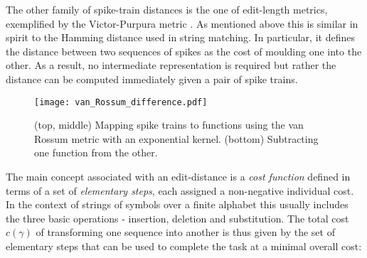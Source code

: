 \documentclass[12pt]{extarticle}
\begin{document}
\noindent
The other family of spike-train distances is the one of edit-length
metrics, exemplified by the Victor-Purpura metric \cite{Victor-Purpura_1,
  Victor-Purpura_2}. As mentioned above this is similar in spirit to the Hamming
distance used in string matching. In particular, it defines the
distance between two sequences of spikes as the cost of moulding one
into the other. As a result, no intermediate representation is
required but rather the distance can be computed immediately given a
pair of spike trains.\\

\begin{comment}
This can be modelled by adding an extra parameter:
\begin{equation}
	\delta f = 1 - \mu f
\end{equation}
with $0 \leq \mu \leq 1$. When $\mu$ is equal to zero, the function
increases by a unit at every spike as in the original kernel map,
expressing an unlimited capacity of the synapse to conduct
current. When it is non-zero on the other hand, $\mu$ scales the
function at the arrival of an impulse depending on its immediate
history, reflecting a short-term ``depressing'' effect of a spike on
synaptic conductance. The effect of this extra parameter on the
distance measure is that some spikes contribute a greater amount to it
than others, depending on how closely they follow previous spikes. Due
to the interaction between spikes occurring at different times the
mapping cannot be thought of as a linear filter when used with this
extension - it can rather be represented as a sum of non-linear
kennels of increasing order.
\end{comment}

\begin{figure}[H]
	\texttt{[image: van\_Rossum\_difference.pdf]}
    \caption{(top, middle) Mapping spike trains to functions using the 
 van Rossum metric with an exponential kernel. (bottom) Subtracting one
 function from the other.}
\end{figure}

\noindent
The main concept associated with an edit-distance is a \textit{cost
  function} defined in terms of a set of \textit{elementary steps},
each assigned a non-negative individual cost. In the context of
strings of symbols over a finite alphabet this usually includes the
three basic operations - insertion, deletion and substitution. The
total cost $c(\gamma)$ of transforming one sequence into another is
thus given by the set of elementary steps that can be used to complete
the task at a minimal overall cost:
\end{document}

